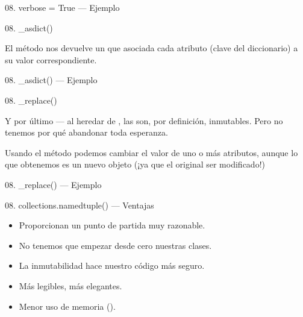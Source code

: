 \begin{frame}{08. verbose = True — Ejemplo}
  \scriptsize
\end{frame}

\begin{frame}{08. \_asdict()}
  \begin{block}{}
    \centering
    El método  nos devuelve un
     que asociada cada atributo (clave del
    diccionario) a su valor correspondiente.
  \end{block}
\end{frame}

\begin{frame}{08. \_asdict() — Ejemplo}
  \small
\end{frame}

\begin{frame}{08. \_replace()}
  \begin{center}{}
    Y por último — al heredar de , las
     son, por definición, inmutables. Pero no
    tenemos por qué abandonar toda esperanza.
  \end{center}

  \begin{block}{}
    \centering
    Usando el método  podemos cambiar el valor
    de uno o más atributos, aunque lo que obtenemos es un nuevo objeto
    (¡ya que el original  ser modificado!)
  \end{block}
\end{frame}

\begin{frame}{08. \_replace() — Ejemplo}
  \scriptsize
\end{frame}

\begin{frame}{08. collections.namedtuple() — Ventajas}
  \begin{itemize}
    \item Proporcionan un punto de partida muy razonable.
    \item No tenemos que empezar desde cero nuestras clases.
    \item La inmutabilidad hace nuestro código más seguro.
    \item Más legibles, más elegantes.
    \item Menor uso de memoria ().
  \end{itemize}
\end{frame}


